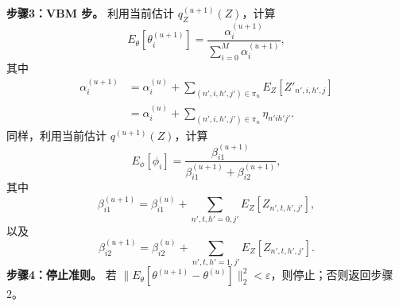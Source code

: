 \noindent\textbf{步骤3：VBM 步。}
利用当前估计 $q_Z^{(u+1)}(Z)$，计算
\begin{equation}
E_{\theta}[\theta_i^{(u+1)}]=\frac{\alpha_i^{(u+1)}}{\sum_{i=0}^{M}\alpha_i^{(u+1)}},
\tag{4.52}
\end{equation}
其中
\begin{equation}
\begin{aligned}
\alpha_i^{(u+1)}&=\alpha_i^{(u)}+\sum_{(n',i,h',j')\in\pi_n}E_Z[Z'_{n',i,h',j}]\\
&=\alpha_i^{(u)}+\sum_{(n',i,h',j')\in\pi_n}\eta_{n'ih'j'}.
\end{aligned}
\tag{4.53}
\end{equation}
同样，利用当前估计 $q^{(u+1)}(Z)$，计算
\begin{equation}
E_{\phi}[\phi_i]=\frac{\beta_{i1}^{(u+1)}}{\beta_{i1}^{(u+1)}+\beta_{i2}^{(u+1)}},
\tag{4.54}
\end{equation}
其中
\[
\beta_{i1}^{(u+1)}=\beta_{i1}^{(u)}+\sum_{n',t,h'=0,j'}E_Z[Z_{n',t,h',j'}],
\]
以及
\[
\beta_{i2}^{(u+1)}=\beta_{i2}^{(u)}+\sum_{n',t,h'=1,j'}E_Z[Z_{n',t,h',j'}].
\]
\noindent\textbf{步骤4：停止准则。}
若 $\lVert E_{\theta}[\theta^{(u+1)}-\theta^{(u)}]\rVert_2^2<\varepsilon$，则停止；否则返回步骤2。
\FloatBarrier
